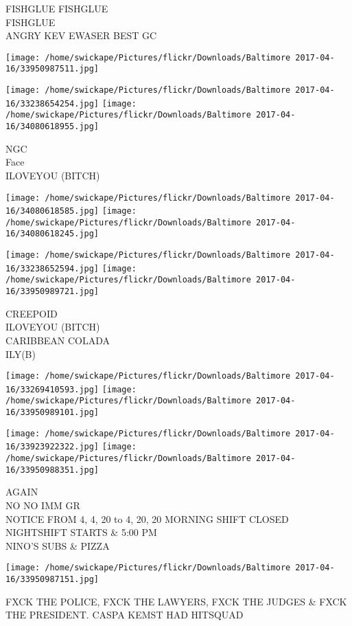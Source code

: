 \documentclass[10pt,letterpaper]{article}
\begin{document}
FISHGLUE FISHGLUE\\
FISHGLUE\\
ANGRY KEV EWASER BEST GC\\
\pagebreak

\texttt{[image: /home/swickape/Pictures/flickr/Downloads/Baltimore 2017-04-16/33950987511.jpg]}

\vspace{0.25in}
\texttt{[image: /home/swickape/Pictures/flickr/Downloads/Baltimore 2017-04-16/33238654254.jpg]}
\texttt{[image: /home/swickape/Pictures/flickr/Downloads/Baltimore 2017-04-16/34080618955.jpg]}

NGC\\
Face\\
ILOVEYOU (BITCH)\\
\pagebreak

\texttt{[image: /home/swickape/Pictures/flickr/Downloads/Baltimore 2017-04-16/34080618585.jpg]}
\texttt{[image: /home/swickape/Pictures/flickr/Downloads/Baltimore 2017-04-16/34080618245.jpg]}

\texttt{[image: /home/swickape/Pictures/flickr/Downloads/Baltimore 2017-04-16/33238652594.jpg]}
\texttt{[image: /home/swickape/Pictures/flickr/Downloads/Baltimore 2017-04-16/33950989721.jpg]}

CREEPOID\\
ILOVEYOU (BITCH)\\
CARIBBEAN COLADA\\
ILY(B)\\
\pagebreak

\texttt{[image: /home/swickape/Pictures/flickr/Downloads/Baltimore 2017-04-16/33269410593.jpg]}
\texttt{[image: /home/swickape/Pictures/flickr/Downloads/Baltimore 2017-04-16/33950989101.jpg]}

\texttt{[image: /home/swickape/Pictures/flickr/Downloads/Baltimore 2017-04-16/33923922322.jpg]}
\texttt{[image: /home/swickape/Pictures/flickr/Downloads/Baltimore 2017-04-16/33950988351.jpg]}

AGAIN\\
NO NO IMM GR\\
NOTICE FROM 4, 4, 20 to 4, 20, 20 MORNING SHIFT CLOSED NIGHTSHIFT STARTS \& 5:00 PM\\
NINO'S SUBS \& PIZZA\\
\pagebreak

\texttt{[image: /home/swickape/Pictures/flickr/Downloads/Baltimore 2017-04-16/33950987151.jpg]}

FXCK THE POLICE, FXCK THE LAWYERS, FXCK THE JUDGES \& FXCK THE PRESIDENT.  CASPA KEMST HAD HITSQUAD\\
\pagebreak
\end{document}
